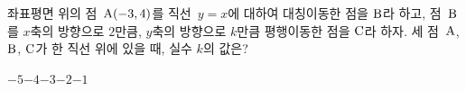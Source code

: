 좌표평면 위의 점~$\mathrm{A}(-3{,}\mkern3mu\mathopen{}4)$를 직선~$y=x$에 대하여 대칭이동한 점을 $\mathrm{B}$라 하고, 점~$\mathrm{B}$를 $x$축의 방향으로 $2$만큼, $y$축의 방향으로 $k$만큼 평행이동한 점을 $\mathrm{C}$라 하자. 세 점~$\mathrm{A}$, $\mathrm{B}$, $\mathrm{C}$가 한 직선 위에 있을 때, 실수 $k$의 값은?
\begin{choices32}{$-5$}{$-4$}{$-3$}{$-2$}{$-1$}\end{choices32}
